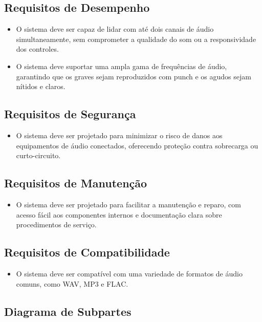 \subsection{Requisitos de Desempenho}
\begin{itemize}
    \item O sistema deve ser capaz de lidar com até dois canais de áudio simultaneamente, sem comprometer a qualidade do som ou a responsividade dos controles.
    \item O sistema deve suportar uma ampla gama de frequências de áudio, garantindo que os graves sejam reproduzidos com punch e os agudos sejam nítidos e claros.
\end{itemize}

\subsection{Requisitos de Segurança}
\begin{itemize}
    \item O sistema deve ser projetado para minimizar o risco de danos aos equipamentos de áudio conectados, oferecendo proteção contra sobrecarga ou curto-circuito.
\end{itemize}

\subsection{Requisitos de Manutenção}
\begin{itemize}
    \item O sistema deve ser projetado para facilitar a manutenção e reparo, com acesso fácil aos componentes internos e documentação clara sobre procedimentos de serviço.
\end{itemize}

\subsection{Requisitos de Compatibilidade}
\begin{itemize}
    \item O sistema deve ser compatível com uma variedade de formatos de áudio comuns, como WAV, MP3 e FLAC.
\end{itemize}

\subsection{Diagrama de Subpartes}

